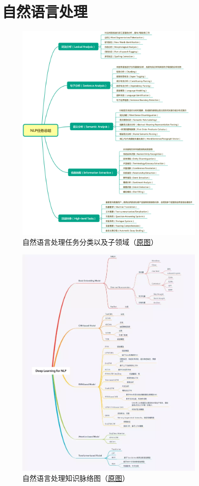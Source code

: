 \documentclass[lang=cn,11pt,a4paper]{eleganttemplate}
\begin{document}
\section{自然语言处理}
\begin{figure}[htbp]
  \centering
  \vspace{0cm}
  \includegraphics[width=0.8\textwidth]{image/nlp_1.png}
  \caption{自然语言处理任务分类以及子领域（\href{https://www.jianshu.com/p/d80b065bdcf0}{原图}）}
\end{figure}

\begin{figure}[htbp]
  \centering
  \vspace{-2cm}
  \includegraphics[width=0.8\textwidth]{image/nlp_2.png}
  \caption{自然语言处理知识脉络图（\href{https://www.jiqizhixin.com/articles/2019-06-21}{原图}）}
\end{figure}
\end{document}

